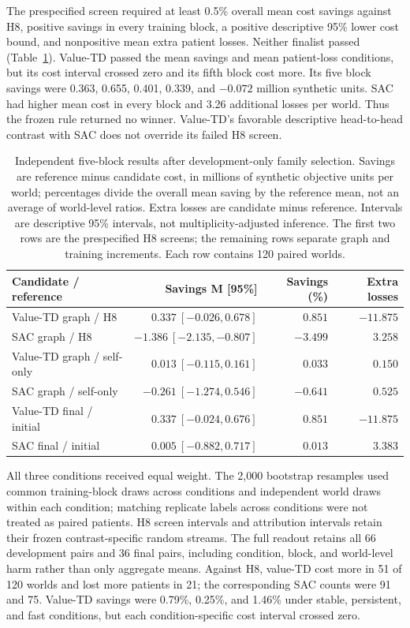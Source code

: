 \documentclass[preprint,review,12pt]{elsarticle}
\begin{document}
The prespecified screen required at least 0.5\% overall mean cost savings
against H8, positive savings in every training block, a positive descriptive
95\% lower cost bound, and nonpositive mean extra patient losses.
Neither finalist passed (Table~\ref{tab:family-selection}). Value-TD passed
the mean savings and mean patient-loss conditions, but its cost interval
crossed zero and its fifth block cost more. Its five block savings were
0.363, 0.655, 0.401, 0.339, and $-0.072$ million synthetic units.
SAC had higher mean cost in every block and 3.26 additional losses per world.
Thus the frozen rule returned no winner. Value-TD's favorable descriptive
head-to-head contrast with SAC does not override its failed H8 screen.

\begin{table}[tbp]
\centering
\caption{Independent five-block results after development-only family
selection. Savings are reference minus candidate cost, in millions of
synthetic objective units per world; percentages divide the overall mean
saving by the reference mean, not an average of world-level ratios.
Extra losses are candidate minus reference. Intervals are descriptive
95\% intervals, not multiplicity-adjusted inference. The first two rows
are the prespecified H8 screens; the remaining rows separate graph and
training increments. Each row contains 120 paired worlds.}
\label{tab:family-selection}
\small
\setlength{\tabcolsep}{4pt}
\begin{tabularx}{\textwidth}{Xrrr}
\toprule
Candidate / reference & Savings M [95\%] & Savings (\%) & Extra losses \\
\midrule
Value-TD graph / H8 & $0.337\ [-0.026,0.678]$ & $0.851$ & $-11.875$ \\
SAC graph / H8 & $-1.386\ [-2.135,-0.807]$ & $-3.499$ & $3.258$ \\
Value-TD graph / self-only & $0.013\ [-0.115,0.161]$ & $0.033$ & $0.150$ \\
SAC graph / self-only & $-0.261\ [-1.274,0.546]$ & $-0.641$ & $0.525$ \\
Value-TD final / initial & $0.337\ [-0.024,0.676]$ & $0.851$ & $-11.875$ \\
SAC final / initial & $0.005\ [-0.882,0.717]$ & $0.013$ & $3.383$ \\
\bottomrule
\end{tabularx}
\end{table}

All three conditions received equal weight. The 2,000 bootstrap resamples
used common training-block draws across conditions and independent world
draws within each condition; matching replicate labels across conditions
were not treated as paired patients. H8 screen intervals and attribution
intervals retain their frozen contrast-specific random streams. The full
readout retains all 66 development pairs and 36 final pairs, including
condition, block, and world-level harm rather than only aggregate means.
Against H8, value-TD cost more in 51 of 120 worlds and lost more patients
in 21; the corresponding SAC counts were 91 and 75. Value-TD savings
were 0.79\%, 0.25\%, and 1.46\% under stable, persistent, and fast conditions,
but each condition-specific cost interval crossed zero.
\end{document}
